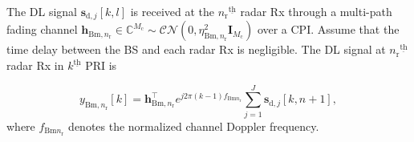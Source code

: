 \documentclass[10pt,journal]{IEEEtran}
\newcommand{\paren}[1]{\left({#1}\right)}
\newcommand{\bracket}[1]{{\left [{#1}\right ]}}
\newcommand{\braces}[1]{{\left\{ {#1}\right\}}}
\newcommand{\ith}[1]    {{#1}^{\underline{\text{th}}}}
\newcommand{\rr}{_\mathrm{r}}
\newcommand{\target}{\mathrm{t}}
\newcommand{\sfrac}[2]{#1/#2}
\theoremstyle{definition}
\begin{document}
 
The DL signal $\mathbf{s}_{\textrm{d},j}\bracket{k,l}$ is received at the $\ith{n\rr}$ radar Rx through a multi-path fading channel $\mathbf{h}_{\mathrm{Bm},n\rr}\in\mathbb{C}^{\mathit{M}_\mathrm{c}}\sim \mathcal{CN}\paren{0,\eta^2_{\textrm{Bm},n\rr}\mathbf{I}_{\mathit{M}_\mathrm{c}}}$ over a CPI. Assume that the time delay between the BS and each radar Rx is negligible. The DL signal at $\ith{n\rr}$ radar Rx in $
\ith{k}$ PRI is\par\noindent\small
\begin{equation}
y_{\mathrm{Bm},n\rr}\bracket{k}=\mathbf{h}_{\mathrm{Bm},n\rr}^\top e^{j2\pi\paren{k-1} f_{\mathrm{Bm}n_\mathrm{r}}}
\sum_{j=1}^\mathit{J}\mathbf{s}_{\textrm{d},j}\bracket{k,n+1},\label{eq:DL_direct}
\end{equation}\normalsize
where $f_{\mathrm{Bm}n_\mathrm{r}}$ denotes the normalized channel Doppler frequency.  
\end{document}
